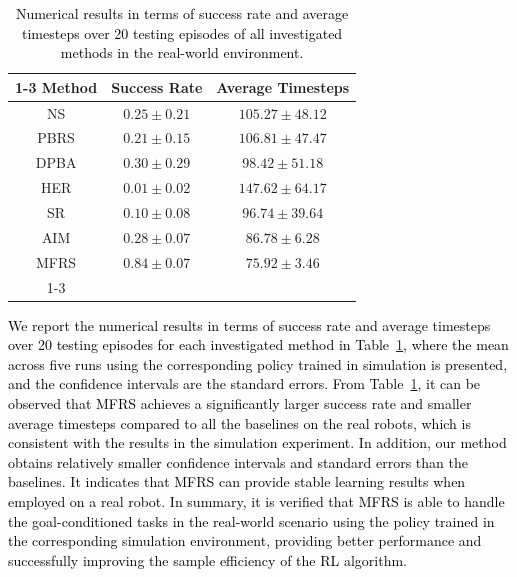 \documentclass[journal]{IEEEtran}
\begin{document}
\begin{table}[tb]
\caption{\textcolor{black}{Numerical results in terms of success rate and average timesteps over 20 testing episodes of all investigated methods in the real-world environment.}}
\centering
\setlength{\tabcolsep}{5mm}\renewcommand{}
\begin{tabular}{c|c|c}
\cmidrule[\heavyrulewidth]{1-3}
Method  & Success Rate         & Average Timesteps \\
\hline 
NS      & $0.25\pm 0.21$       & $105.27\pm 48.12$ \\
PBRS    & $0.21\pm 0.15$       & $106.81\pm 47.47$ \\
DPBA    & $0.30\pm 0.29$       & $98.42\pm 51.18$ \\
HER     & $0.01\pm 0.02$       & $147.62\pm 64.17$ \\
SR      & $0.10\pm 0.08$       & $96.74\pm 39.64$ \\
AIM     & $0.28\pm 0.07$       & $86.78\pm 6.28$ \\
MFRS   	& $\bm{0.84\pm 0.07}$  & $\bm{75.92\pm 3.46}$ \\
\cmidrule[\heavyrulewidth]{1-3}
\end{tabular}
\label{table:res-real}
\end{table}


\textcolor{black}{We report the numerical results in terms of success rate and average timesteps over 20 testing episodes for each investigated method in Table~\ref{table:res-real}, where the mean across five runs using the corresponding policy trained in simulation is presented, and the confidence intervals are the standard errors.
From Table~\ref{table:res-real}, it can be observed that MFRS achieves a significantly larger success rate and smaller average timesteps compared to all the baselines on the real robots, which is consistent with the results in the simulation experiment.
In addition, our method obtains relatively smaller confidence intervals and standard errors than the baselines. It indicates that MFRS can provide stable learning results when employed on a real robot.
In summary, it is verified that MFRS is able to handle the goal-conditioned tasks in the real-world scenario using the policy trained in the corresponding simulation environment, providing better performance and successfully improving the sample efficiency of the RL algorithm.}
\end{document}
